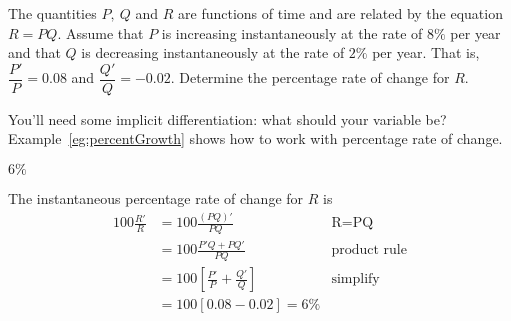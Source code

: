 \begin{question}[1997D, 2012H]
The quantities $P,\ Q$ and $R$ are functions of time and are related
by the equation $R=PQ$. Assume that $P$ is increasing instantaneously at
the rate of $8\%$ per year and that $Q$ is decreasing instantaneously at
the rate of $2\%$ per year. That is, $\dfrac{P'}{P}=0.08$ and $\dfrac{Q'}{Q}=-0.02$.
Determine the percentage rate of change for $R$.
\end{question}
\begin{hint}
You'll need some implicit differentiation: what should your variable be?
Example~\ref*{eg:percentGrowth} shows how to work with percentage rate of change.
\end{hint}
\begin{answer} $6\%$
\end{answer}
\begin{solution}
The instantaneous percentage rate of change for $R$ is
\begin{align*}
100\frac{R'}{R}&=100\frac{(PQ)'}{PQ}&\mbox{R=PQ}\\
&=100\frac{P'Q+PQ'}{PQ}&\mbox{product rule}\\
&=100\left[\frac{P'}{P}+\frac{Q'}{Q}\right]&\mbox{simplify}\\
&=100[0.08-0.02]
=6\%
\end{align*}
\end{solution}


